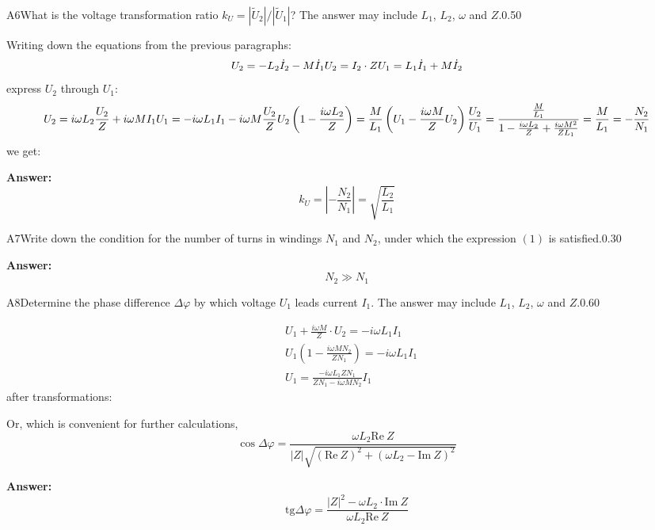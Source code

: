 \documentclass[11pt,a4paper]{article}
\begin{document}
\begin{solcard}{A6}{What is the voltage transformation ratio $k_{U}={\left|\tilde{U}_{2}\right|}/{\left|\tilde{U}_{1}\right|}$? The answer may include $L_1$, $L_2$, $\omega$ and $Z$.}{0.50}

Writing down the equations from the previous paragraphs: $$ U_2=-L_2 \dot{I}_2-M \dot{I}_1 \\ U_2=I_2 \cdot Z \\ U_1=L_1 \dot{I}_1+M \dot{I}_2 $$ express $U_2$ through $U_1$: $$ U_2=i \omega L_2 \frac{U_2}{Z}+i \omega M I_1 \\ U_1=-i \omega L_1 I_1-i \omega M \frac{U_2}{Z} \\ U_2\left(1-\frac{i \omega L_2}{Z}\right)=\frac{M}{L_1}\left(U_1-\frac{i \omega M}{Z} U_2\right)\\ \frac{U_2}{U_1}=\frac{\frac{M}{L_1}}{1-\frac{i \omega L_2}{Z}+\frac{i \omega M^2}{Z L_1}}=\frac{M}{L_1}=-\frac{N_2}{N_1} $$ we get:

\par\smallskip\noindent\textbf{Answer:} $$ k_U=\left|-\frac{N_2}{N_1}\right|=\sqrt{\dfrac{L_2}{L_1}} $$
\end{solcard}

\begin{solcard}{A7}{Write down the condition for the number of turns in windings $N_{1}$ and $N_{2}$, under which the expression $(1)$ is satisfied.}{0.30}
\par\smallskip\noindent\textbf{Answer:} $$ N_2 \gg N_1 $$
\end{solcard}

\begin{solcard}{A8}{Determine the phase difference $\Delta\varphi$ by which voltage $U_1$ leads current $I_1$. The answer may include $L_1$, $L_2$, $\omega$ and $Z$.}{0.60}

$$ \begin{aligned} & U_1+\frac{i \omega M}{Z} \cdot U_2=-i \omega L_1 I_1 \\ & U_1\left(1-\frac{i \omega M N_2}{Z N_1}\right)=-i \omega L_1 I_1\\ & U_1 = \frac{-i\omega L_1 Z N_1}{ZN_1 - i\omega MN_2}I_1 \end{aligned} $$after transformations:


Or, which is convenient for further calculations, $$\cos{\Delta \varphi} = \frac{\omega L_2 \text{Re}~Z}{|Z|\sqrt{(\text{Re}~Z)^2+(\omega L_2-\text{Im}~Z)^2}}$$

\par\smallskip\noindent\textbf{Answer:} $$\text{tg}{\Delta\varphi}=\frac{|Z|^2- \omega L_2 \cdot \text{Im}~Z}{\omega L_2 \text{Re}~Z}$$
\end{solcard}
\end{document}
